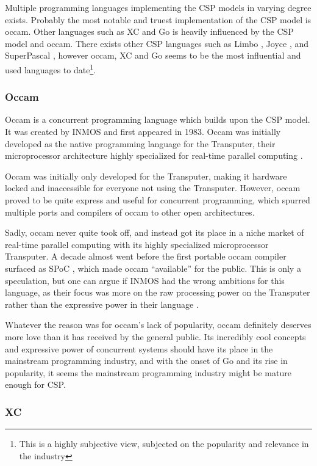 Multiple programming languages implementing the CSP models in varying degree exists. Probably the most notable and truest implementation of the CSP model is occam. Other languages such as XC and Go is heavily influenced by the CSP model and occam. There exists other CSP languages such as Limbo \citep{limbo}, Joyce \citep{joyce}, and SuperPascal \citep{superpascal}, however occam, XC and Go seems to be the most influential and used languages to date\footnote{This is a highly subjective view, subjected on the popularity and relevance in the industry}. 


\subsubsection{Occam}
\label{sssec:occam}

Occam is a concurrent programming language which builds upon the CSP model. It was created by INMOS \citep{occam} and first appeared in 1983. Occam was initially developed as the native programming language for the Transputer, their microprocessor architecture highly specialized for real-time parallel computing \citep{transputer}. 

Occam was initially only developed for the Transputer, making it hardware locked and inaccessible for everyone not using the Transputer. However, occam proved to be quite express and useful for concurrent programming, which spurred multiple ports and compilers of occam to other open architectures. 

Sadly, occam never quite took off, and instead got its place in a niche market of real-time parallel computing with its highly specialized microprocessor Transputer. A decade almost went before the first portable occam compiler surfaced as SPoC \citep{spoc}, which made occam ``available'' for the public. This is only a speculation, but one can argue if INMOS had the wrong ambitions for this language, as their focus was more on the raw processing power on the Transputer rather than the expressive power in their language \citep{occam}. 

Whatever the reason was for occam's lack of popularity, occam definitely deserves more love than it has received by the general public. Its incredibly cool concepts and expressive power of concurrent systems should have its place in the mainstream programming industry, and with the onset of Go and its rise in popularity, it seems the mainstream programming industry might be mature enough for CSP.


\subsubsection{XC}
\label{sssec:xc}

